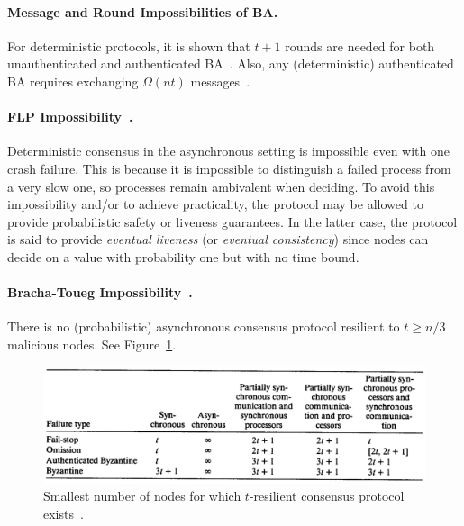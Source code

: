 \documentclass[11pt]{article}
\theoremstyle{mytheoremstyle}
\begin{document}
\paragraph{Message and Round Impossibilities of BA.}
For deterministic protocols, it is shown that $t+1$ rounds are needed for both unauthenticated and authenticated BA~\cite{FischerLynch81,Dolev:1982:STOC}. Also, any (deterministic) authenticated BA requires exchanging $\Omega(nt)$ messages~\cite{Dolev:Reischuk:82}.

\paragraph{FLP Impossibility~\cite{FLP}.} Deterministic consensus in the asynchronous setting is impossible even with one crash failure. This is because it is impossible to distinguish a failed process from a very slow one, so processes remain ambivalent when deciding. To avoid this impossibility and/or to achieve practicality, the protocol may be allowed to provide probabilistic safety or liveness guarantees. In the latter case, the protocol is said to provide \emph{eventual liveness} (or \emph{eventual consistency}) since nodes can decide on a value with probability one but with no time bound.

\paragraph{Bracha-Toueg Impossibility~\cite{Bracha:Toueg:1983}.} There is no (probabilistic) asynchronous consensus protocol resilient to $t \geq n/3$ malicious nodes. See Figure~\ref{fig:bounds}.

\begin{figure}
	\centering
	\includegraphics[width=0.9\linewidth]{bounds}
	\caption{Smallest number of nodes for which $t$-resilient consensus protocol exists~\cite{dwork:1988:cpp}.}
	\label{fig:bounds}
\end{figure}
\end{document}
